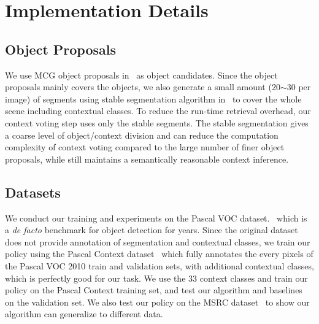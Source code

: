 \section{Implementation Details}
\subsection{Object Proposals}
We use MCG object proposals in~\cite{arbelaez2014multiscale} as object candidates. Since the object proposals mainly covers the objects,  we also generate a small amount (20$\sim$30 per image) of segments using stable segmentation algorithm in~\cite{chen2011piecing} to cover the whole scene including contextual classes. To reduce the run-time retrieval overhead, our context voting step uses only the stable segments. The stable segmentation gives a coarse level of object/context division and can reduce the computation complexity of context voting compared to the large number of finer object proposals, while still maintains a semantically reasonable context inference. 

\subsection{Datasets}
We conduct our training and experiments on the Pascal VOC dataset.~\cite{Everingham10} which is a \textit{de facto} benchmark for object detection for years. Since the original dataset does not provide annotation of segmentation and contextual classes, we train our policy using the Pascal Context dataset~\cite{mottaghi2014role} which fully annotates the every pixels of the Pascal VOC 2010 train and validation sets, with additional contextual classes, which is perfectly good for our task. We use the 33 context classes and train our policy on the Pascal Context training set, and test our algorithm and baselines on the validation set. We also test our policy on the MSRC dataset~\cite{shotton2006textonboost} to show our algorithm can generalize to different data. 

